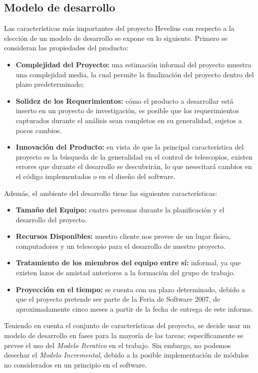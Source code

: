 \documentclass[letterpaper,titlepage,spanish,10pt]{article}
\begin{document}
\subsection{Modelo de desarrollo}
Las caracter\'isticas m\'as importantes del proyecto Hevelius con
respecto a la elecci\'on de un modelo de desarrollo se expone en lo
siguiente. Primero se consideran las propiedades del producto:

\begin{itemize}
\item \textbf{Complejidad del Proyecto:} una estimaci\'on informal del proyecto
  muestra una complejidad media, la cual permite la finalizaci\'on del
  proyecto dentro del plazo predeterminado;
\item \textbf{Solidez de los Requerimientos:} c\'omo el producto a
  desarrollar est\'a inserto en un proyecto de investigaci\'on, es posible que
  los requerimientos capturados durante el an\'alisis sean completos en su generalidad,
  sujetos a pocos cambios.
\item \textbf{Innovaci\'on del Producto:} en vista de que la principal caracter\'istica
  del proyecto es la b\'usqueda de la generalidad en el control de telescopios, existen 
  errores que durante el desarrollo se descubrir\'an, lo que nesecitar\'a cambios en el
  c\'odigo implementados o en el dise\~no del software.
\end{itemize}

Adem\'as, el ambiente del desarrollo tiene las siguientes caracter\'isticas:

\begin{itemize}
\item \textbf{Tama\~no del Equipo:} cuatro personas durante la planificaci\'on y el 
  desarrollo del proyecto.
\item \textbf{Recursos Disponibles:} nuestro cliente nos provee de un lugar f\'isico, 
  computadores y un telescopio para el desarrollo de nuestro proyecto.
\item \textbf{Tratamiento de los miembros del equipo entre s\'i:} informal, ya
  que existen lazos de amistad anteriores a la formaci\'on del grupo de trabajo.
\item \textbf{Proyecci\'on en el tiempo:} se cuenta con un plazo determinado,
  debido a que el proyecto pretende ser parte de la Feria de Software 2007, 
  de aproximadamente cinco meses a partir de la fecha de entrega de este informe.
\end{itemize}


Teniendo en cuenta el conjunto de caracter\'isticas del proyecto, se
decide usar un modelo de desarrollo en fases para la
mayor\'ia de las tareas; espec\'ificamente se prevee el uso del \emph{Modelo
Iterativo} en el trabajo. Sin embargo, no podemos desechar el \emph{Modelo
Incremental}, debido a la posible implementaci\'on de m\'odulos no considerados en un
principio en el software.
\end{document}

